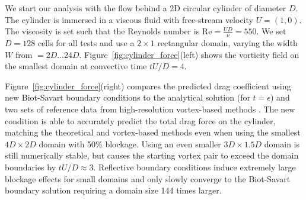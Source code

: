 \documentclass[final,1p,times]{elsarticle}
\begin{document}
We start our analysis with the flow behind a 2D circular cylinder of diameter $D$. The cylinder is immersed in a viscous fluid with free-stream velocity $U=(1,0)$. The viscosity is set such that the Reynolds number is $\text{Re}=\frac{UD}{\nu}=550$. We set $D=128$ cells for all tests and use a $2\times 1$ rectangular domain, varying the width $W$ from $=2D\ldots 24D$. Figure~\ref{fig:cylinder_force}(left) shows the vorticity field on the smallest domain at convective time $tU/D=4$.

Figure~\ref{fig:cylinder_force}(right) compares the predicted drag coefficient using new Biot-Savart boundary conditions to the analytical solution \cite{Collins1973TheCylinder} (for $t=\epsilon$) and two sets of reference data from high-resolution vortex-based methods \cite{KoumoutsakostAN1995High-resolutionMethods, Gillis2019AMethod}. The new condition is able to accurately predict the total drag force on the cylinder, matching the theoretical and vortex-based methods even when using the smallest $4D\times2D$ domain with 50\% blockage. Using an even smaller $3D\times1.5D$ domain is still numerically stable, but causes the starting vortex pair to exceed the domain boundaries by $tU/D\approx3$. 
Reflective boundary conditions induce extremely large blockage effects for small domains and only slowly converge to the Biot-Savart boundary solution requiring a domain size 144 times larger. %

\end{document}
